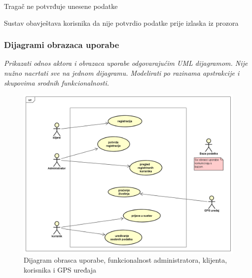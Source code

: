 \begin{packed_item}
\begin{packed_item}
\begin{packed_enum}
						\end{packed_enum}
						
						\item[3.a] Tragač ne potvrđuje unesene podatke
						\item[] \begin{packed_enum}
							
							\item Sustav obavještava korisnika da nije potvrdio podatke prije izlaska iz prozora
							
						\end{packed_enum}
						
					\end{packed_item}
					
				\end{packed_item}
					
					
					
				\subsubsection{Dijagrami obrazaca uporabe}
					
					\textit{Prikazati odnos aktora i obrazaca uporabe odgovarajućim UML dijagramom. Nije nužno nacrtati sve na jednom dijagramu. Modelirati po razinama apstrakcije i skupovima srodnih funkcionalnosti.}
				\eject		
				
				\begin{figure}[H]
					\includegraphics[scale=0.5]{slike/dijagram1.PNG} %
					\centering
					\caption{Dijagram obrasca uporabe, funkcionalnost administratora, klijenta, korisnika i GPS uređaja}
					\label{fig:dijagram1} %
				\end{figure}
				
